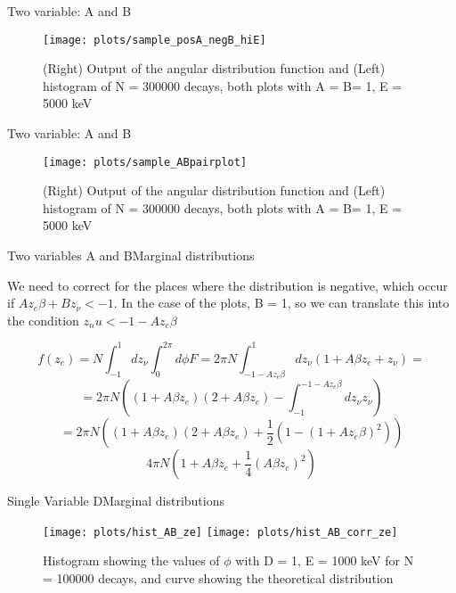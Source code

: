 \documentclass{beamer}
\begin{document}
\begin{frame}{Two variable: A and B}
	\begin{figure}
		\centering
		\texttt{[image: plots/sample\_posA\_negB\_hiE]}
		\caption{(Right) Output of the angular distribution function and (Left) histogram of N = 300000 decays, both plots with A = B= 1, E = 5000 keV}
	\end{figure}
\end{frame}
\begin{frame}{Two variable: A and B}
	\begin{figure}
		\centering
		\texttt{[image: plots/sample\_ABpairplot]}
		\caption{(Right) Output of the angular distribution function and (Left) histogram of N = 300000 decays, both plots with A = B= 1, E = 5000 keV}
	\end{figure}
\end{frame}

\begin{frame}{Two variables A and B}{Marginal distributions}
	
	We need to correct for the places where the distribution is negative, which occur if $Az_e\beta+Bz_\nu < -1$. In the case of the plots, B = 1, so we can translate this into the condition $z_nu < -1-Az_e\beta$  
	
	$$f(z_e) = N\int_{-1}^{1}dz_\nu\int_{0}^{2\pi}d\phi F = 2\pi N\int_{-1-Az_e\beta}^{1}dz_\nu(1 + A\beta z_e + z_\nu) = $$
	$$ = 2\pi N\left((1+A\beta z_e)(2+A\beta z_e)-\int_{-1}^{-1-Az_e\beta}dz_\nu z_\nu\right) $$
	$$ = 2\pi N\left((1+A\beta z_e)(2+A\beta z_e)+\frac 12 (1-(1+Az_e\beta)^2)\right)  $$
	$$4\pi N \left(1 + A\beta z_e + \frac 14 (A\beta z_e)^2 \right)$$
	
	
\end{frame}

\begin{frame}{Single Variable D}{Marginal distributions}
	\begin{figure}
		\centering
		\texttt{[image: plots/hist\_AB\_ze]}
		\texttt{[image: plots/hist\_AB\_corr\_ze]}
		\caption{Histogram showing the values of $\phi$ with D = 1, E = 1000 keV for N = 100000 decays, and curve showing the theoretical distribution}
	\end{figure}
\end{frame}
\end{document}
